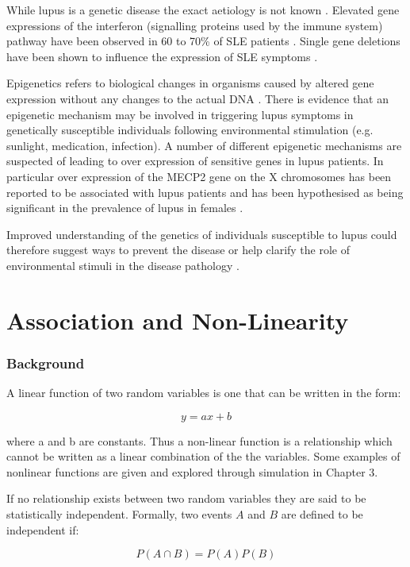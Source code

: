 \documentclass[a4paper, 12pt]{report}
\begin{document}
While lupus is a genetic disease the exact aetiology is not known \cite{autoimmune}. Elevated gene expressions of the interferon (signalling proteins used by the immune system) pathway have been observed in 60 to 70\% of SLE patients \cite{autoimmunePollard}. Single gene deletions have been shown to influence the expression of SLE symptoms \cite{autoimmune}. 

Epigenetics refers to biological changes in organisms caused by altered gene expression without any changes to the actual DNA \cite{Pan2009}. There is evidence that an epigenetic mechanism may be involved in triggering lupus symptoms in genetically susceptible individuals following environmental stimulation (e.g. sunlight, medication, infection). A number of different epigenetic mechanisms are suspected of leading to over expression of sensitive genes in lupus patients. In particular over expression of the MECP2 gene on the X chromosomes has been reported to be associated with lupus patients and has been hypothesised as being significant in the prevalence of lupus in females \cite{Pan2009}. 

Improved understanding of the genetics of individuals susceptible to lupus could therefore suggest ways to  prevent the disease or help clarify the role of environmental stimuli in the disease pathology \cite{autoimmunePollard}.

\chapter{Association and Non-Linearity}

\subsection*{Background}

A linear function of two random variables is one that can be written in the form:

\[
y = ax + b
\]

where a and b are constants. Thus a non-linear function is a relationship which cannot be written as a linear combination of the the variables. Some examples of nonlinear functions are given and explored through simulation in Chapter 3.

If no relationship exists between two random variables they are said to be statistically independent. Formally, two events $A$ and $B$ are defined to be independent if:

\[
P(A \cap B) = P(A)P(B)
\]
 
\end{document}

